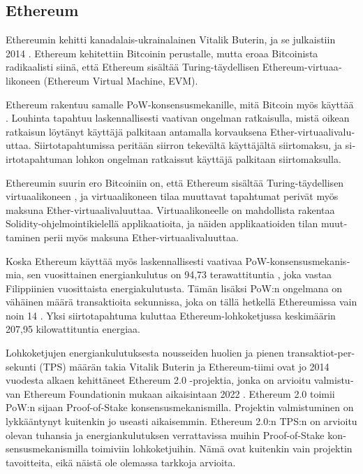 \subsection{Ethereum\label{ethereum}}
\begin{otherlanguage}{english}

Ethereumin kehitti kanadalais-ukrainalainen Vitalik Buterin, ja se julkaistiin 2014 \cite{buterin2017ethereum}. Ethereum kehitettiin Bitcoinin perustalle, mutta eroaa Bitcoinista radikaalisti siinä, että Ethereum sisältää Turing-täydellisen Ethereum-virtuaalikoneen (Ethereum Virtual Machine, EVM).

Ethereum rakentuu samalle PoW-konsensusmekanille, mitä Bitcoin myös käyttää \cite{buterin2017ethereum}. Louhinta tapahtuu laskennallisesti vaativan ongelman ratkaisulla, mistä oikean ratkaisun löytänyt käyttäjä palkitaan antamalla korvauksena Ether-virtuaalivaluuttaa. Siirtotapahtumissa peritään siirron tekevältä käyttäjältä siirtomaksu, ja siirtotapahtuman lohkon ongelman ratkaissut käyttäjä palkitaan siirtomaksulla.

Ethereumin suurin ero Bitcoiniin on, että Ethereum sisältää Turing-täydellisen virtuaalikoneen \cite{buterin2017ethereum}, ja virtuaalikoneen tilaa muuttavat tapahtumat perivät myös maksuna Ether-virtuaalivaluuttaa. Virtuaalikoneelle on mahdollista rakentaa Solidity-ohjelmointikielellä applikaatioita, ja näiden applikaatioiden tilan muuttaminen perii myös maksuna Ether-virtuaalivaluuttaa. 

Koska Ethereum käyttää myös laskennallisesti vaativaa PoW-konsensusmekanismia, sen vuosittainen energiankulutus on 94,73 terawattituntia \cite{ethereumenergy}, joka vastaa Filippiinien vuosittaista energiakulutusta. Tämän lisäksi PoW:n ongelmana on vähäinen määrä transaktioita sekunnissa, joka on tällä hetkellä Ethereumissa vain noin 14 \cite{ethereum-tps}. Yksi siirtotapahtuma kuluttaa Ethereum-lohkoketjussa keskimäärin 207,95 kilowattituntia energiaa. 

Lohkoketjujen energiankulutuksesta nousseiden huolien ja pienen transaktiot-per-sekunti (TPS) määrän takia Vitalik Buterin ja Ethereum-tiimi ovat jo 2014 vuodesta alkaen kehittäneet Ethereum 2.0 -projektia, jonka on arvioitu valmistuvan Ethereum Foundationin mukaan aikaisintaan 2022 \cite{eth2.0}. Ethereum 2.0 toimii PoW:n sijaan Proof-of-Stake konsensusmekanismilla. Projektin valmistuminen on  lykkääntynyt kuitenkin jo useasti aikaisemmin. Ethereum 2.0:n TPS:n on arvioitu olevan tuhansia ja energiankulutuksen verrattavissa muihin Proof-of-Stake konsensusmekanismilla toimiviin lohkoketjuihin. Nämä ovat kuitenkin vain projektin tavoitteita, eikä näistä ole olemassa tarkkoja arvioita.

\end{otherlanguage}